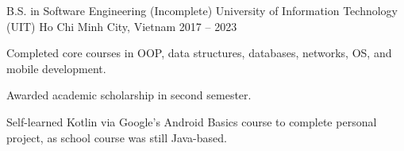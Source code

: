 \begin{cventries}
    \cventry
    {B.S. in Software Engineering (Incomplete)}
    {University of Information Technology (UIT)}
    {Ho Chi Minh City, Vietnam}
    {2017 -- 2023}
    {
        \begin{cvitems}
            \item {Completed core courses in OOP, data structures, databases, networks, OS, and mobile development.}
            \item {Awarded academic scholarship in second semester.}
            \item {Self-learned Kotlin via Google’s Android Basics course to complete personal project, as school course was still Java-based.}
        \end{cvitems}
    }
\end{cventries}

